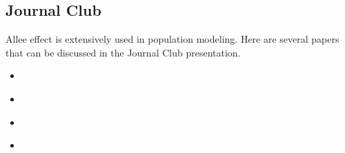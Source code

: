 \documentclass{article}
\begin{document}
\subsection{Journal Club}
Allee effect is extensively used in population modeling. Here are several papers that can be discussed in the Journal Club presentation.
\begin{itemize}
    \item \textcite{AgentBasedModel_Ciunkiewicz2022} 
    \item \textcite{AgentBasedModel_Hunter2018}
    \item \textcite{AgentBasedModel_Nitzsche2024}
        \item \textcite{AgentBasedModel_Perez2009}
\end{itemize}



\printbibliography
\end{document}
